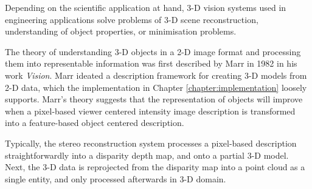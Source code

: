 \documentclass[12pt,a4paper,oneside,pdftex]{report}
\begin{document}
Depending on the scientific application at hand, 3-D vision systems used in engineering applications solve problems of 3-D scene reconstruction, understanding of object properties, or minimisation problems\citep{Sonka07}. 


The theory of understanding 3-D objects in a 2-D image format and processing them into representable information was first described by Marr in 1982 in his work \emph{Vision}. Marr ideated a description framework for creating 3-D models from 2-D data, which the implementation in Chapter \ref{chapter:implementation} loosely supports. Marr's theory suggests that the representation of objects will improve when a pixel-based viewer centered intensity image description is transformed into a feature-based object centered description.




Typically, the stereo reconstruction system processes a pixel-based description straightforwardly into a disparity depth map, and onto a partial 3-D model. Next, the 3-D data is reprojected from the disparity map into a point cloud as a single entity, and only processed afterwards in 3-D domain.
\end{document}

